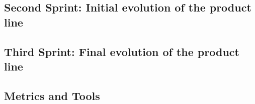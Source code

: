 \subsection{Second Sprint: Initial evolution of the product line}


\subsection{Third Sprint: Final evolution of the product line}




\subsection{Metrics and Tools}


